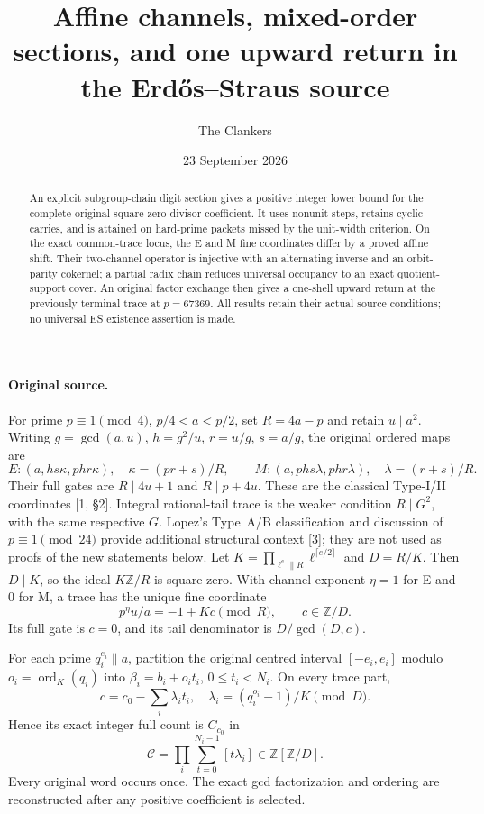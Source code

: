 \documentclass[10pt,reqno]{amsart}
\title[Affine channels, mixed-order sections, and upward return]{Affine channels, mixed-order sections, and one upward return in the Erd\H{o}s--Straus source}
\author{The Clankers}\date{23 September 2026}
\begin{document}
\begin{abstract}
An explicit subgroup-chain digit section gives a positive integer lower bound
for the complete original square-zero divisor coefficient. It uses nonunit steps,
retains cyclic carries, and is attained on hard-prime packets missed by the
unit-width criterion. On the exact common-trace locus, the E and M fine
coordinates differ by a proved affine shift. Their two-channel operator is
injective with an alternating inverse and an orbit-parity cokernel; a partial
radix chain reduces universal occupancy to an exact quotient-support cover.
An original factor exchange then gives a one-shell upward return at the
previously terminal trace at $p=67369$. All results retain their actual source
conditions; no universal ES existence assertion is made.
\end{abstract}
\maketitle

\paragraph{Original source.}
For prime $p\equiv1\pmod4$, $p/4<a<p/2$, set $R=4a-p$ and retain $u\mid a^2$.
Writing $g=\gcd(a,u)$, $h=g^2/u$, $r=u/g$, $s=a/g$, the original ordered maps are
\[
 E:(a,hs\kappa,phr\kappa),\quad\kappa=(pr+s)/R,
\qquad
 M:(a,phs\lambda,phr\lambda),\quad\lambda=(r+s)/R.
\]
Their full gates are $R\mid4u+1$ and $R\mid p+4u$. These are the classical
Type-I/II coordinates [1, \S2]. Integral rational-tail trace is the weaker
condition $R\mid G^2$, with the same respective $G$.
Lopez's Type~A/B classification and discussion of $p\equiv1\pmod{24}$ provide
additional structural context [3]; they are not used as proofs of the new
statements below.
Let $K=\prod_{\ell^e\parallel R}\ell^{\lceil e/2\rceil}$ and $D=R/K$.
Then $D\mid K$, so the ideal $K\mathbb Z/R$ is square-zero. With channel
exponent $\eta=1$ for E and $0$ for M, a trace has the unique fine coordinate
\[
 p^\eta u/a=-1+Kc\pmod R,\qquad c\in\mathbb Z/D.
\]
Its full gate is $c=0$, and its tail denominator is $D/\gcd(D,c)$.

For each prime $q_i^{e_i}\parallel a$, partition the original centred interval
$[-e_i,e_i]$ modulo $o_i=\operatorname{ord}_K(q_i)$ into
$\beta_i=b_i+o_it_i$, $0\le t_i<N_i$. On every trace part,
\[
 c=c_0-\sum_i\lambda_it_i,\quad
 \lambda_i=(q_i^{o_i}-1)/K\pmod D.
\]
Hence its exact integer full count is $C_{c_0}$ in
\[
 \mathcal C=\prod_i\sum_{t=0}^{N_i-1}[t\lambda_i]
 \in\mathbb Z[\mathbb Z/D].                                      \tag{1}
\]
Every original word occurs once. The exact gcd factorization and ordering are
reconstructed after any positive coefficient is selected.
\end{document}
